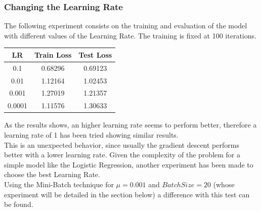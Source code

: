 \documentclass[
	letterpaper, %
	10pt, %
]{class}
\begin{document}
\subsubsection{Changing the Learning Rate}

The following experiment consists on the training and evaluation of the model with different values of the Learning Rate. The training is fixed at 100 iterations.

\begin{center}
  \begin{tabular}{ |c|c|c| }
    \hline
    LR     & Train Loss & Test Loss \\
    \hline
    0.1    & 0.68296    & 0.69123   \\
    0.01   & 1.12164    & 1.02453   \\
    0.001  & 1.27019    & 1.21357   \\
    0.0001 & 1.11576    & 1.30633   \\
    \hline
  \end{tabular}
\end{center}

As the results shows, an higher learning rate seems to perform better, therefore a learning rate of 1 has been tried showing similar results.\\
This is an unexpected behavior, since usually the gradient descent performs better with a lower learning rate. Given the complexity of the problem for a simple model like the Logistic Regression, another experiment has been made to choose the best Learning Rate.\\

Using the Mini-Batch technique for $\mu=0.001$ and $Batch Size = 20$ (whose experiment will be detailed in the section below) a difference with this test can be found.
\end{document}
